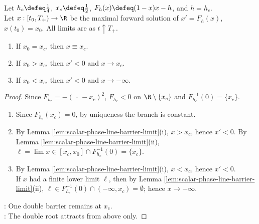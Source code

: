 \begin{theorem} \label{thm:critical-harvest-phase-line} \\
Let $h_c\defeq\frac14$, $x_c\defeq\frac12$, $F_h(x)\defeq(1-x)x-h$, and $h=h_c$.\\
Let $x:[t_0,T_+)\to\R$ be the maximal forward solution of $x'=F_h(x)$, $x(t_0)=x_0$. All limits are as $t\uparrow T_+$.
\begin{enumerate}[label=(\roman*)]
\setlength{\itemsep}{0pt}
\item If $x_0=x_c$, then $x\equiv x_c$.
\item If $x_0>x_c$, then $x'<0$ and $x\to x_c$.
\item If $x_0<x_c$, then $x'<0$ and $x\to-\infty$.
\end{enumerate}
\begin{proof}
Since $F_{h_c}=-(\,\cdot\,-x_c)^2$, $F_{h_c}<0$ on $\R\setminus\{x_c\}$ and $F_{h_c}^{-1}(0)=\{x_c\}$.
\begin{enumerate}[label=(\roman*)]
\setlength{\itemsep}{0pt}
\item Since $F_{h_c}(x_c)=0$, by uniqueness the branch is constant.
\item By Lemma \ref{lem:scalar-phase-line-barrier-limit}(i), $x>x_c$, hence $x'<0$. By Lemma \ref{lem:scalar-phase-line-barrier-limit}(ii), $\ell=\lim x\in[x_c,x_0]\cap F_{h_c}^{-1}(0)=\{x_c\}$.
\item By Lemma \ref{lem:scalar-phase-line-barrier-limit}(i), $x<x_c$, hence $x'<0$.\\
If $x$ had a finite lower limit $\ell$, then by Lemma \ref{lem:scalar-phase-line-barrier-limit}(ii), $\ell\in F_{h_c}^{-1}(0)\cap(-\infty,x_c)=\emptyset$; hence $x\to-\infty$.
\end{enumerate}
: One double barrier remains at $x_c$.\\
: The double root attracts from above only.
\end{proof}
\end{theorem}

